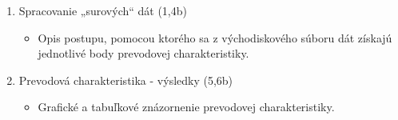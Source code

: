 \documentclass[a4paper, 10pt, ]{article}
\begin{document}
\begin{enumerate}[leftmargin=0pt, labelsep=4mm, itemsep=0pt]
    \item Spracovanie „surových“ dát  \hfill {\color{MidnightBlue} (1,4b)}
    \begin{itemize}[leftmargin=0pt, labelsep=4mm, itemsep=0pt] \color{mynotecolor}
        \item Opis postupu, pomocou ktorého sa z východiskového súboru dát získajú jednotlivé body prevodovej charakteristiky.
	\end{itemize}

    \item Prevodová charakteristika - výsledky \hfill {\color{MidnightBlue} (5,6b)}
    \begin{itemize}[leftmargin=0pt, labelsep=4mm, itemsep=0pt] \color{mynotecolor}
        \item Grafické a tabuľkové znázornenie prevodovej charakteristiky.
	\end{itemize}








\end{enumerate}
\end{document}

